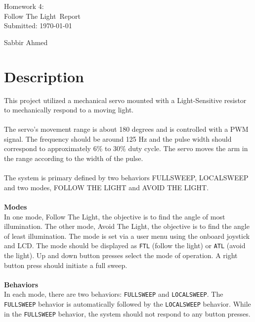 \documentclass[usletter, 12pt]{article}
\newcommand{\project}{Homework 4: \\ Follow The Light}
\newcommand{\Sabbir}{Sabbir Ahmed}
\begin{document}
    \begin{titlepage}

        \vspace*{\fill} %
        \begin{center}

            {\LARGE \project~Report}\\ [1.5cm]

            Submitted: \today
            
            \vspace*{\fill}

            \Sabbir

        \end{center}
        \vspace*{\fill} %

    \end{titlepage}

    \section{Description} This project utilized a mechanical servo mounted with
    a Light-Sensitive resistor to mechanically respond to a moving light. \\~\\
    \noindent The servo's movement range is about 180 degrees and is controlled
    with a PWM signal. The frequency should be around 125 Hz and the pulse
    width should correspond to approximately 6\% to 30\% duty cycle. The servo
    moves the arm in the range according to the width of the pulse. \\~\\
    \noindent The system is primary defined by two behaviors FULLSWEEP,
    LOCALSWEEP and two modes, FOLLOW THE LIGHT and AVOID THE LIGHT. \\~\\
    \noindent \textbf{Modes} \\
    In one mode, Follow The Light, the objective is to find the angle of most
    illumination. The other mode, Avoid The Light, the objective is to find the
    angle of least illumination. The mode is set via a user menu using the
    onboard joystick and LCD. The mode should be displayed as \texttt{FTL}
    (follow the light) or \texttt{ATL} (avoid the light). Up and down button
    presses select the mode of operation. A right button press should initiate
    a full sweep. \\~\\
    \noindent \textbf{Behaviors} \\
    In each mode, there are two behaviors: \texttt{FULLSWEEP} and
    \texttt{LOCALSWEEP}. The \texttt{FULLSWEEP} behavior is automatically
    followed by the \texttt{LOCALSWEEP} behavior. While in the
    \texttt{FULLSWEEP} behavior, the system should not respond to any button
    presses. \\
\end{document}
